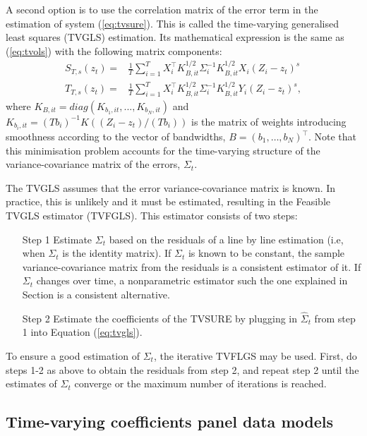 A second option is to use the correlation matrix of the error term in the estimation of system (\ref{eq:tvsure}). This is called the time-varying generalised least squares (TVGLS) estimation. Its mathematical expression is the same as (\ref{eq:tvols}) with the following matrix components:
\begin{align}
S_{T, s}(z_t) = &\frac{1}{T}\sum_{i=1}^T X_i^{\top} K_{B,it}^{1/2}\Sigma _{i}^{-1} K_{B,it}^{1/2} X_i (Z_i -z_t)^s \nonumber\\
T_{T, s}(z_t) = &\frac{1}{T}\sum_{i=1}^T X_i^{\top} K_{B,it}^{1/2} \Sigma _{i}^{-1} K_{B, it}^{1/2} Y_i (Z_i - z_t)^s,
\label{eq:tvgls}
\end{align}
where $K_{B,it}= diag( K_{b_1,it}, ... , K_{b_N,it})$  and $K_{b_i,it}= (T b_i)^{-1} K((Z_i-z_t)/(T b_i))$ is the matrix of weights introducing smoothness according to the vector of bandwidths, $B=(b_1,\ldots,b_N)^\top$. Note that this minimisation problem accounts for the time-varying structure of the variance-covariance matrix of the errors, $\Sigma_t$. 

The TVGLS assumes that the error variance-covariance matrix is known. In practice, this is unlikely and it must be estimated, resulting in the Feasible TVGLS estimator (TVFGLS). This estimator consists of two steps:
\begin{enumerate} 
\item [Step 1] Estimate $\Sigma_t$ based on the residuals of a line by line estimation (i.e,  when $\Sigma_t$ is the identity matrix). If $\Sigma_t$ is known to be constant, the sample variance-covariance matrix from the residuals is a consistent estimator of it. If $\Sigma_t$ changes over time, a nonparametric estimator such the one explained in Section  is a consistent alternative.
\item [Step 2] Estimate the coefficients of the TVSURE by plugging in $\hat \Sigma_t$ from step 1 into Equation (\ref{eq:tvgls}).
\end{enumerate}

To ensure a good estimation of $\Sigma_t$, the iterative TVFLGS may be used. First, do steps 1-2 as above to obtain the residuals from step 2, and repeat step 2 until the estimates of $\Sigma_t$ converge or the maximum number of iterations is reached. 



\subsection{Time-varying coefficients panel data models}

